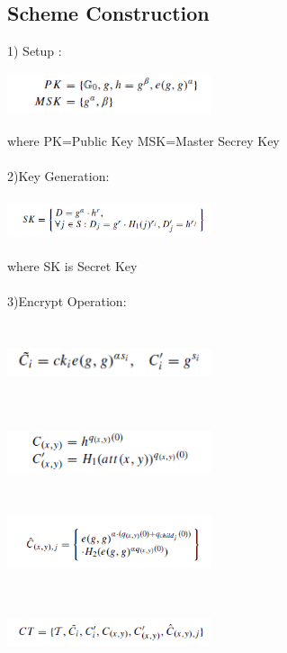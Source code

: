 \documentclass[a4paper,12pt]{article}
\begin{document}
\subsection{Scheme Construction}
1) Setup : \\
\includegraphics[width=6cm,height=2cm]{fig3.PNG}\\
where PK=Public Key
MSK=Master Secrey Key\\\\
2)Key Generation:\\
\includegraphics[width=6cm,height=2cm]{fig4.PNG}\\
where SK is Secret Key\\ \\
3)Encrypt Operation:\\ \\
\includegraphics[width=6cm,height=2cm]{fig5.PNG}\\ \\
\includegraphics[width=6cm,height=2cm]{fig6.PNG}\\ \\
\includegraphics[width=6cm,height=2cm]{fig7.PNG}\\ \\
\includegraphics[width=6cm,height=2cm]{fig8.PNG}\\ \\
\end{document}
